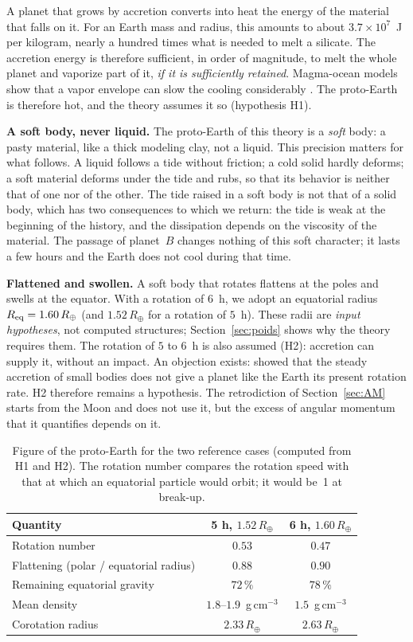 \documentclass[11pt,a4paper]{article}
\newcommand{\Rt}{\ensuremath{R_\oplus}}
\newcommand{\Req}{\ensuremath{R_{\rm eq}}}
\begin{document}
A planet that grows by accretion converts into heat the energy of the material that falls on it. For an Earth mass and radius, this amounts to about $3.7\times10^7$~J per kilogram, nearly a hundred times what is needed to melt a silicate. The accretion energy is therefore sufficient, in order of magnitude, to melt the whole planet and vaporize part of it, \emph{if it is sufficiently retained}. Magma-ocean models show that a vapor envelope can slow the cooling considerably \citep{ElkinsTanton2012,Hamano2013,Lebrun2013,Rubie2015}. The proto-Earth is therefore hot, and the theory assumes it so (hypothesis H1).

\textbf{A soft body, never liquid.} The proto-Earth of this theory is a \emph{soft} body: a pasty material, like a thick modeling clay, not a liquid. This precision matters for what follows. A liquid follows a tide without friction; a cold solid hardly deforms; a soft material deforms under the tide and rubs, so that its behavior is neither that of one nor of the other. The tide raised in a soft body is not that of a solid body, which has two consequences to which we return: the tide is weak at the beginning of the history, and the dissipation depends on the viscosity of the material. The passage of planet~$B$ changes nothing of this soft character; it lasts a few hours and the Earth does not cool during that time.

\textbf{Flattened and swollen.} A soft body that rotates flattens at the poles and swells at the equator. With a rotation of $6$~h, we adopt an equatorial radius $\Req=1.60\,\Rt$ (and $1.52\,\Rt$ for a rotation of $5$~h). These radii are \emph{input hypotheses}, not computed structures; Section~\ref{sec:poids} shows why the theory requires them. The rotation of $5$ to $6$~h is also assumed (H2): accretion can supply it, without an impact. An objection exists: \citet{DonesTremaine1993} showed that the steady accretion of small bodies does not give a planet like the Earth its present rotation rate. H2 therefore remains a hypothesis. The retrodiction of Section~\ref{sec:AM} starts from the Moon and does not use it, but the excess of angular momentum that it quantifies depends on it.

\begin{table}[htbp]
\centering
\caption{Figure of the proto-Earth for the two reference cases (computed from H1 and H2). The rotation number compares the rotation speed with that at which an equatorial particle would orbit; it would be~1 at break-up.\label{tab:forme}}
\small
\begin{tabular}{lcc}
\toprule
Quantity & 5 h, $1.52\,\Rt$ & 6 h, $1.60\,\Rt$ \\
\midrule
Rotation number & $0.53$ & $0.47$ \\
Flattening (polar / equatorial radius) & $0.88$ & $0.90$ \\
Remaining equatorial gravity & $72\,\%$ & $78\,\%$ \\
Mean density & $1.8$--$1.9$~g\,cm$^{-3}$ & $1.5$~g\,cm$^{-3}$ \\
Corotation radius & $2.33\,\Rt$ & $2.63\,\Rt$ \\
\bottomrule
\end{tabular}
\end{table}
\end{document}
